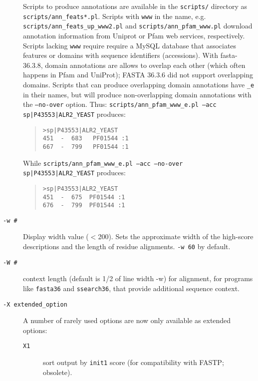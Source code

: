 \documentclass[11pt]{article}
\newcommand{\CURRENT}{fasta-36.3.8}
\begin{document}
\begin{description}
Scripts to produce annotations are available in the \texttt{scripts/}
directory as \texttt{scripts/ann\_feats*.pl}. Scripts with
\texttt{www} in the name,
e.g. \texttt{scripts/ann\_feats\_up\_www2.pl} and
\texttt{scripts/ann\_pfam\_www.pl} download annotation information
from Uniprot or Pfam web services, respectively.  Scripts lacking
\texttt{www} require require a MySQL database that associates features
or domains with sequence identifiers (accessions).  With \CURRENT,
domain annotations are allows to overlap each other (which often
happens in Pfam and UniProt); FASTA 36.3.6 did not support overlapping
domains.  Scripts that can produce overlapping domain annotations have
\texttt{\_e} in their names, but will produce non-overlapping domain
annotations with the \texttt{--no-over} option. Thus:
\texttt{scripts/ann\_pfam\_www\_e.pl --acc sp|P43553|ALR2\_YEAST}
produces:
\begin{quote}
\begin{verbatim}
>sp|P43553|ALR2_YEAST
451  -  683   PF01544 :1
667  -  799   PF01544 :1
\end{verbatim}
\end{quote}
While \texttt{scripts/ann\_pfam\_www\_e.pl --acc --no-over
  sp|P43553|ALR2\_YEAST} produces:
\begin{quote}
\begin{verbatim}
>sp|P43553|ALR2_YEAST
451  -  675  PF01544 :1
676  -  799  PF01544 :1
\end{verbatim}
\end{quote}

\item[\texttt{-w \#}] 
  Display width value ($<$200). Sets the approximate width of the
  high-score descriptions and the length of residue
  alignments. \texttt{-w 60} by default.

\item[\texttt{-W \#}] context length (default is 1/2 of line width -w)
  for alignment, for programs like \texttt{fasta36} and
  \texttt{ssearch36}, that provide additional sequence context.

\item[\texttt{-X extended\_option}]
A number of rarely used options are now only available as extended options:

\begin{description}

\item[\texttt{X1}] sort output by \texttt{init1} score (for
  compatibility with FASTP; obsolete).


\end{description}
\end{description}
\end{document}
